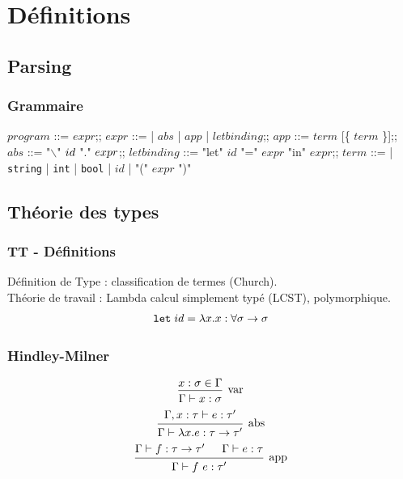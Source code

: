 \documentclass{beamer}
\begin{document}
\section{Définitions}
\subsection{Parsing}
\begin{frame}
		\frametitle{Grammaire}
		\begin{bnf}
				$program$ ::= $expr$;;
				$expr$ ::= | $abs$ | $app$ | $letbinding$;;
				$app$ ::= $term$ [\{ $term$ \}];;
				$abs$ ::= "$\backslash$" $id\space$ "." $\space expr$;;
				$letbinding$ ::= "let" $id$ "=" $expr$ "in" $expr$;;
				$term$ ::= | \texttt{string} | \texttt{int} | \texttt{bool} | $id$ | "(" $expr$ ")"
		\end{bnf} 
\end{frame}

\subsection{Théorie des types}
\begin{frame}
		\frametitle{TT - Définitions}
		Définition de Type : classification de termes (Church).\\
		Théorie de travail : Lambda calcul simplement typé (LCST), polymorphique.\\
		\[
				\texttt{let\;} id = \lambda x.x :\forall \sigma\to\sigma
		\]
\end{frame}

\begin{frame}
\frametitle{Hindley-Milner}
		\[
		\begin{prooftree}
				\hypo{x:\sigma\in\Gamma}
				\infer1[var]{\Gamma \vdash x:\sigma}
		\end{prooftree}
		\]
		\newline
		\[
		\begin{prooftree}
				\hypo{\Gamma, x:\tau \vdash e:\tau'}
				\infer1[abs]{\Gamma \vdash \lambda x.e:\tau \to \tau'}
		\end{prooftree}
		\]
		\newline
		\[
		\begin{prooftree}
				\hypo{\Gamma \vdash f:\tau \to \tau'}
				\hypo{\Gamma \vdash e : \tau}
				\infer2[app]{\Gamma \vdash f\ e : \tau'}
		\end{prooftree}
		\]
\end{frame}
\end{document}
